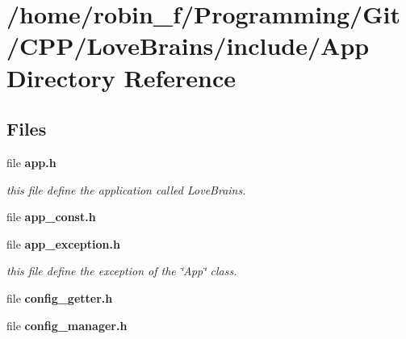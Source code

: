 \section{/home/robin\+\_\+f/\+Programming/\+Git/\+C\+P\+P/\+Love\+Brains/include/\+App Directory Reference}
\label{dir_a2d2df47111fea16b4ba499124caad1d}
\subsection*{Files}
\begin{DoxyCompactItemize}
\item 
file {\bf app.\+h}
\begin{DoxyCompactList}\small\item\em this file define the application called Love\+Brains. \end{DoxyCompactList}\item 
file {\bfseries app\+\_\+const.\+h}
\item 
file {\bf app\+\_\+exception.\+h}
\begin{DoxyCompactList}\small\item\em this file define the exception of the \char`\"{}\+App\char`\"{} class. \end{DoxyCompactList}\item 
file {\bfseries config\+\_\+getter.\+h}
\item 
file {\bfseries config\+\_\+manager.\+h}
\end{DoxyCompactItemize}
